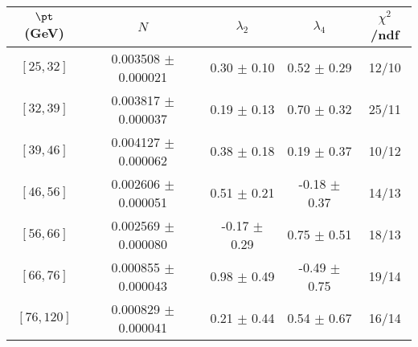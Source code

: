 \begin{tabular}{c||c|c|c|c}
$\pt$ (GeV) & $N$ & $\lambda_{2}$ & $\lambda_4$  & $\chi^2$/ndf  \\
\hline
$[25, 32]$ & 0.003508 $\pm$ 0.000021 & 0.30 $\pm$ 0.10 & 0.52 $\pm$ 0.29 & 12/10\\
$[32, 39]$ & 0.003817 $\pm$ 0.000037 & 0.19 $\pm$ 0.13 & 0.70 $\pm$ 0.32 & 25/11\\
$[39, 46]$ & 0.004127 $\pm$ 0.000062 & 0.38 $\pm$ 0.18 & 0.19 $\pm$ 0.37 & 10/12\\
$[46, 56]$ & 0.002606 $\pm$ 0.000051 & 0.51 $\pm$ 0.21 & -0.18 $\pm$ 0.37 & 14/13\\
$[56, 66]$ & 0.002569 $\pm$ 0.000080 & -0.17 $\pm$ 0.29 & 0.75 $\pm$ 0.51 & 18/13\\
$[66, 76]$ & 0.000855 $\pm$ 0.000043 & 0.98 $\pm$ 0.49 & -0.49 $\pm$ 0.75 & 19/14\\
$[76, 120]$ & 0.000829 $\pm$ 0.000041 & 0.21 $\pm$ 0.44 & 0.54 $\pm$ 0.67 & 16/14\\
\end{tabular}
